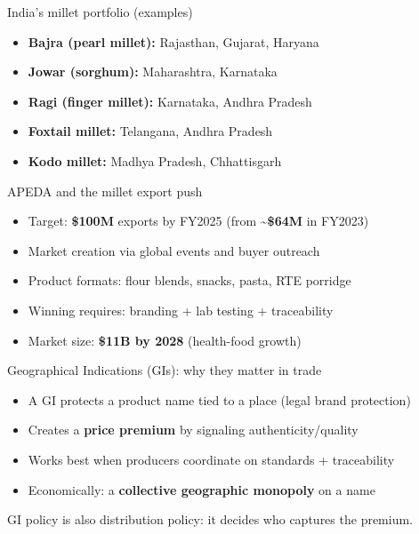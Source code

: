 \documentclass[
  ignorenonframetext,
  aspectratio=169,
]{beamer}
\makeatletter
\providecommand{\tightlist}{%
  \setlength{\itemsep}{0pt}\setlength{\parskip}{0pt}}
\let\quarto@originallabel\label
\DeclareRobustCommand*{\label}[1]{\quarto@originallabel{#1}}
\makeatother
\begin{document}
\begin{frame}
\begin{block}{India's millet portfolio (examples)}
\label{indias-millet-portfolio-examples}
\begin{itemize}
\tightlist
\item
  \textbf{Bajra (pearl millet):} Rajasthan, Gujarat, Haryana
\item
  \textbf{Jowar (sorghum):} Maharashtra, Karnataka
\item
  \textbf{Ragi (finger millet):} Karnataka, Andhra Pradesh
\item
  \textbf{Foxtail millet:} Telangana, Andhra Pradesh
\item
  \textbf{Kodo millet:} Madhya Pradesh, Chhattisgarh
\end{itemize}
\end{block}
\end{frame}

\begin{frame}
\begin{block}{APEDA and the millet export push}
\label{apeda-and-the-millet-export-push}
\begin{itemize}
\tightlist
\item
  Target: \textbf{\$100M} exports by FY2025 (from
  \textasciitilde{}\textbf{\$64M} in FY2023)
\item
  Market creation via global events and buyer outreach
\item
  Product formats: flour blends, snacks, pasta, RTE porridge
\item
  Winning requires: branding + lab testing + traceability
\item
  Market size: \textbf{\$11B by 2028} (health-food growth)
\end{itemize}

\end{block}
\end{frame}

\begin{frame}
\begin{block}{Geographical Indications (GIs): why they matter in trade}
\label{geographical-indications-gis-why-they-matter-in-trade}
\begin{itemize}
\tightlist
\item
  A GI protects a product name tied to a place (legal brand protection)
\item
  Creates a \textbf{price premium} by signaling authenticity/quality
\item
  Works best when producers coordinate on standards + traceability
\item
  Economically: a \textbf{collective geographic monopoly} on a name
\end{itemize}

GI policy is also distribution policy: it decides who captures the
premium.
\end{block}
\end{frame}
\end{document}
